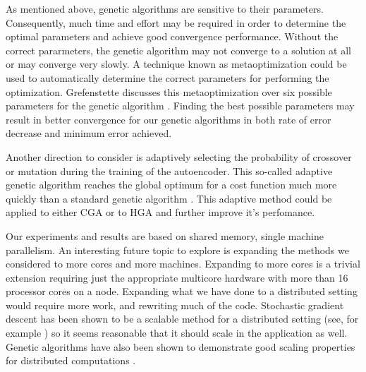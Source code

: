 As mentioned above, genetic algorithms are sensitive to their parameters. Consequently, much time and effort may be required in order to determine the optimal parameters and achieve good convergence performance. Without the correct pararmeters, the genetic algorithm may not converge to a solution at all or may converge very slowly. A technique known as metaoptimization could be used to automatically determine the correct parameters for performing the optimization. Grefenstette discusses this metaoptimization over six possible parameters for the genetic algorithm \cite{metaoptimization}. Finding the best possible parameters may result in better convergence for our genetic algorithms in both rate of error decrease and minimum error achieved.

Another direction to consider is adaptively selecting the probability of crossover or mutation during the training of the autoencoder. This so-called adaptive genetic algorithm reaches the global optimum for a cost function much more quickly than a standard genetic algorithm \cite{srinivas94adaptive}. This adaptive method could be applied to either CGA or to HGA and further improve it's perfomance.

Our experiments and results are based on shared memory, single machine parallelism. An interesting future topic to explore is expanding the methods we considered to more cores and more machines. Expanding to more cores is a trivial extension requiring just the appropriate multicore hardware with more than 16 processor cores on a node. Expanding what we have done to a distributed setting would require more work, and rewriting much of the code. Stochastic gradient descent has been shown to be a scalable method for a distributed setting (see, for example \cite{zinkevich2010psgd}) so it seems reasonable that it should scale in the application as well. Genetic algorithms have also been shown to demonstrate good scaling properties for distributed computations \cite{Belding95thedistributed}.
